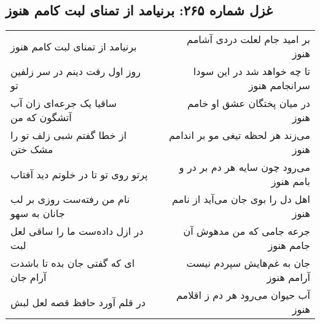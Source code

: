 \begin{center}
\section*{غزل شماره ۲۶۵: برنیامد از تمنای لبت کامم هنوز}
\label{sec:sh265}
\begin{longtable}{l p{0.5cm} r}
برنیامد از تمنای لبت کامم هنوز
&&
بر امید جام لعلت دردی آشامم هنوز
\\
روز اول رفت دینم در سر زلفین تو
&&
تا چه خواهد شد در این سودا سرانجامم هنوز
\\
ساقیا یک جرعه‌ای زان آب آتشگون که من
&&
در میان پختگان عشق او خامم هنوز
\\
از خطا گفتم شبی زلف تو را مشک ختن
&&
می‌زند هر لحظه تیغی مو بر اندامم هنوز
\\
پرتو روی تو تا در خلوتم دید آفتاب
&&
می‌رود چون سایه هر دم بر در و بامم هنوز
\\
نام من رفته‌ست روزی بر لب جانان به سهو
&&
اهل دل را بوی جان می‌آید از نامم هنوز
\\
در ازل داده‌ست ما را ساقی لعل لبت
&&
جرعه جامی که من مدهوش آن جامم هنوز
\\
ای که گفتی جان بده تا باشدت آرام جان
&&
جان به غم‌هایش سپردم نیست آرامم هنوز
\\
در قلم آورد حافظ قصه لعل لبش
&&
آب حیوان می‌رود هر دم ز اقلامم هنوز
\\
\end{longtable}
\end{center}
